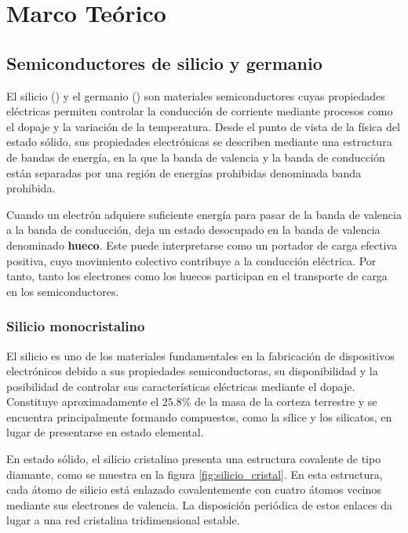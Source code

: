 ﻿\section{Marco Teórico}

\subsection{Semiconductores de silicio y germanio}

El silicio () y el germanio () son materiales semiconductores cuyas propiedades eléctricas permiten controlar la conducción de corriente mediante procesos como el dopaje y la variación de la temperatura. Desde el punto de vista de la física del estado sólido, sus propiedades electrónicas se describen mediante una estructura de bandas de energía, en la que la banda de valencia y la banda de conducción están separadas por una región de energías prohibidas denominada banda prohibida.

Cuando un electrón adquiere suficiente energía para pasar de la banda de valencia a la banda de conducción, deja un estado desocupado en la banda de valencia denominado \textbf{hueco}. Este puede interpretarse como un portador de carga efectiva positiva, cuyo movimiento colectivo contribuye a la conducción eléctrica. Por tanto, tanto los electrones como los huecos participan en el transporte de carga en los semiconductores.

\subsubsection{Silicio monocristalino}

El silicio es uno de los materiales fundamentales en la fabricación de dispositivos electrónicos debido a sus propiedades semiconductoras, su disponibilidad y la posibilidad de controlar sus características eléctricas mediante el dopaje. Constituye aproximadamente el \(25.8\%\) de la masa de la corteza terrestre y se encuentra principalmente formando compuestos, como la sílice y los silicatos, en lugar de presentarse en estado elemental.

En estado sólido, el silicio cristalino presenta una estructura covalente de tipo diamante, como se muestra en la figura \ref{fig:silicio_cristal}. En esta estructura, cada átomo de silicio está enlazado covalentemente con cuatro átomos vecinos mediante sus electrones de valencia. La disposición periódica de estos enlaces da lugar a una red cristalina tridimensional estable.


